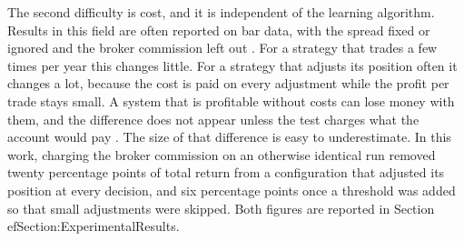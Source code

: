 The second difficulty is cost, and it is independent of the learning algorithm. Results in this field are often reported on bar data, with the spread fixed or ignored and the broker commission left out \cite{fischer_reinforcement_2018, pricope_deep_2021}. For a strategy that trades a few times per year this changes little. For a strategy that adjusts its position often it changes a lot, because the cost is paid on every adjustment while the profit per trade stays small. A system that is profitable without costs can lose money with them, and the difference does not appear unless the test charges what the account would pay \cite{lopez_de_prado_advances_2018}. The size of that difference is easy to underestimate. In this work, charging the broker commission on an otherwise identical run removed twenty percentage points of total return from a configuration that adjusted its position at every decision, and six percentage points once a threshold was added so that small adjustments were skipped. Both figures are reported in Section~
ef{Section:ExperimentalResults}.